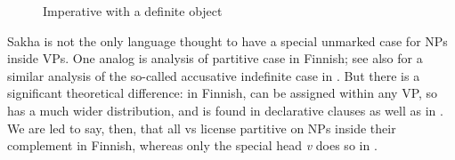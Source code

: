 \documentclass[output=paper]{langsci/langscibook}
\begin{document}
\begin{figure}
    \caption{Imperative with a definite object\label{fig:ex:12.21b}}
\end{figure}

Sakha is not the only language thought to have a special unmarked case for NPs
inside VPs. One analog is  analysis of partitive
case in Finnish; see also \citet{Baker2017} for a similar analysis of the
so-called accusative indefinite case in . But there is a significant
theoretical difference: in Finnish,  can be assigned within any
VP, so  has a much wider distribution, and is found in
declarative clauses as well as in . We are led to say, then, that
all vs license partitive on NPs inside their complement in Finnish, whereas
only the special head \emph{v}\textsubscript{\Imp} does so in .
\end{document}
